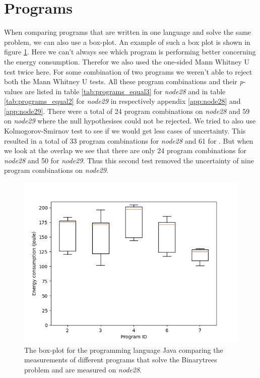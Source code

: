 \section{Programs}
When comparing programs that are written in one language and solve the same problem, we can also use a box-plot. An example of such a box plot is shown in figure \ref{fig:box-lang}. Here we can't always see which program is performing better concerning the energy consumption. Therefor we also used the one-sided Mann Whitney U test twice here. For some combination of two programs we weren't able to reject both the Mann Whitney U tests. All these program combinations and their \textit{p}-values are listed in table \ref{tab:programs_equal3} for \textit{node28} and in table \ref{tab:programs_equal2} for \textit{node29} in respectively appendix \ref{app:node28} and \ref{app:node29}. There were a total of 24 program combinations on \textit{node28} and 59 on \textit{node29} where the null hypothesises could not be rejected. We tried to also use Kolmogorov-Smirnov test to see if we would get less cases of uncertainty. This resulted in a total of 33 program combinations for \textit{node28} and 61 for . But when we look at the overlap we see that there are only 24 program combinations for \textit{node28} and 50 for \textit{node29}. Thus this second test removed the uncertainty of nine program combinations on \textit{node29}.

\begin{figure}[h]
    \centering
    \includegraphics[width=.6\textwidth]{graphs/BOXGroup-java-problem0-3.png}
    \caption{The box-plot for the programming language Java comparing the measurements of different programs that solve the Binarytrees problem and are measured on \textit{node28}.}
    \label{fig:box-lang}
\end{figure}

